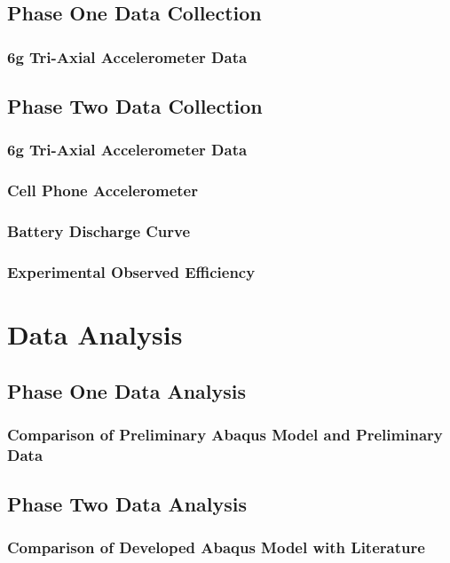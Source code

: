 \documentclass[12pt]{report}
\begin{document}
	\section{Phase One Data Collection}
		\subsection{6g Tri-Axial Accelerometer Data}
			
	\section{Phase Two Data Collection}
		\subsection{6g Tri-Axial Accelerometer Data}
		\subsection{Cell Phone Accelerometer}
		\subsection{Battery Discharge Curve}
		\subsection{Experimental Observed Efficiency}
		
\chapter{Data Analysis}
\label{ch:DataAnalysis}
	\section{Phase One Data Analysis}
		\subsection{Comparison of Preliminary Abaqus Model and Preliminary Data}
			
	\section{Phase Two Data Analysis}
		\subsection{Comparison of Developed Abaqus Model with Literature}
			
\end{document}
